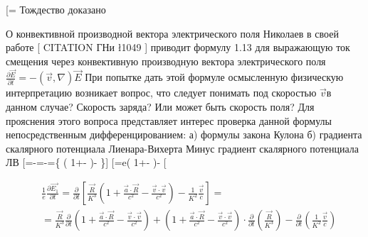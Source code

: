 \documentclass[11pt]{article}
\begin{document}
{[}=\frac{cR}{{{\left( R-\frac{\overrightarrow{v}\cdot \overrightarrow{R}}{c} \right)}^{3}}}{]}
Тождество доказано

О конвективной производной вектора электрического поля Николаев в своей
работе {[} CITATION ГНи \l 1049 {]} приводит формулу 1.13 для выражающую
ток смещения через конвективную производную вектора электрического поля
\(\frac{\partial \overrightarrow{E}}{\partial t}=-\left( \overrightarrow{v},\nabla \right)\overrightarrow{E}\)
При попытке дать этой формуле осмысленную физическую интерпретацию
возникает вопрос, что следует понимать под скоростью
\(\overrightarrow{v}\)в данном случае? Скорость заряда? Или может быть
скорость поля? Для прояснения этого вопроса представляет интерес
проверка данной формулы непосредственным дифференцированием: а) формулы
закона Кулона б) градиента скалярного потенциала Лиенара-Вихерта Минус
градиент скалярного потенциала ЛВ
{[}=-\nabla \varphi =-\nabla {}=\left\{
\left(
1+-
\right)- \right\}{]}
{[}=e\left(
1+-
\right)-\frac{\overrightarrow{v}}{c}{]} {[}

\begin{align}
  & \frac{1}{e}\frac{\partial \overrightarrow{{{E}_{1}}}}{\partial t}=\frac{\partial }{\partial t}\left[ \frac{\overrightarrow{R}}{{{K}^{3}}}\left( 1+\frac{\overrightarrow{a}\cdot \overrightarrow{R}}{{{c}^{2}}}-\frac{\overrightarrow{v}\cdot \overrightarrow{v}}{{{c}^{2}}} \right)-\frac{1}{{{K}^{2}}}\frac{\overrightarrow{v}}{c} \right]= \\ 
 & =\frac{\overrightarrow{R}}{{{K}^{3}}}\frac{\partial }{\partial t}\left( 1+\frac{\overrightarrow{a}\cdot \overrightarrow{R}}{{{c}^{2}}}-\frac{\overrightarrow{v}\cdot \overrightarrow{v}}{{{c}^{2}}} \right)+\left( 1+\frac{\overrightarrow{a}\cdot \overrightarrow{R}}{{{c}^{2}}}-\frac{\overrightarrow{v}\cdot \overrightarrow{v}}{{{c}^{2}}} \right)\cdot \frac{\partial }{\partial t}\left( \frac{\overrightarrow{R}}{{{K}^{3}}} \right)-\frac{\partial }{\partial t}\left( \frac{1}{{{K}^{2}}}\frac{\overrightarrow{v}}{c} \right) \\ 
\end{align}
\end{document}
